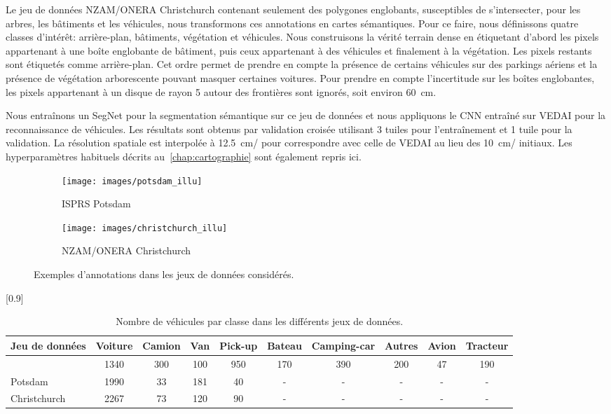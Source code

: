Le jeu de données NZAM/ONERA Christchurch contenant seulement des polygones englobants, susceptibles de s'intersecter, pour les arbres, les bâtiments et les véhicules, nous transformons ces annotations en cartes sémantiques. Pour ce faire, nous définissons quatre classes d'intérêt: arrière-plan, bâtiments, végétation et véhicules. Nous construisons la vérité terrain dense en étiquetant d'abord les pixels appartenant à une boîte englobante de bâtiment, puis ceux appartenant à des véhicules et finalement à la végétation. Les pixels restants sont étiquetés comme arrière-plan. Cet ordre permet de prendre en compte la présence de certains véhicules sur des parkings aériens et la présence de végétation arborescente pouvant masquer certaines voitures. Pour prendre en compte l'incertitude sur les boîtes englobantes, les pixels appartenant à un disque de rayon \SI{5}{\px} autour des frontières sont ignorés, soit environ \SI{60}{\centi\meter}.

Nous entraînons un SegNet pour la segmentation sémantique sur ce jeu de données et nous appliquons le \gls{CNN} entraîné sur \gls{VEDAI} pour la reconnaissance de véhicules. Les résultats sont obtenus par validation croisée utilisant 3 tuiles pour l'entraînement et 1 tuile pour la validation. La résolution spatiale est interpolée à \SI{12,5}{\centi\meter/\px} pour correspondre avec celle de \gls{VEDAI} au lieu des \SI{10}{\centi\meter/\px} initiaux. Les hyperparamètres habituels décrits au~\cref{chap:cartographie} sont également repris ici.

\begin{figure}[t]
\centering
	\begin{subfigure}[]{0.45\textwidth}
    	\texttt{[image: images/potsdam\_illu]}
      \caption{ISPRS Potsdam}
    \end{subfigure}
    \begin{subfigure}[]{0.45\textwidth}
    	\texttt{[image: images/christchurch\_illu]}
      \caption{NZAM/ONERA Christchurch}
    \end{subfigure}
    \caption{Exemples d'annotations dans les jeux de données considérés.}
    \label{fig:datasets}
\end{figure}
\unskip
\begin{table}[t]
	\setlength\tabcolsep{2.5pt}
    \caption{Nombre de véhicules par classe dans les différents jeux de données.}
    \label{tab:vehicle_counts}
    \scalebox{0.9}[0.9]{
	\begin{tabularx}{1.1\textwidth}{Y c c c c c c c cc}
    \toprule
    \textbf{Jeu de données} & \textbf{Voiture} & \textbf{Camion} & \textbf{Van} & \textbf{Pick-up} & \textbf{Bateau} & \textbf{Camping-car} & \textbf{Autres} & \textbf{Avion} & \textbf{Tracteur}\\
    \midrule
     & \num{1340} &  300 & 100 & 950 & 170 & 390 & 200 & 47 & 190\\
     Potsdam & \num{1990} & 33 & 181 & 40 & - & - & - & - & -\\
    Christchurch & \num{2267} & 73 & 120 & 90 & - & - & - & - & -\\
    \bottomrule
    \end{tabularx}}
\end{table}

